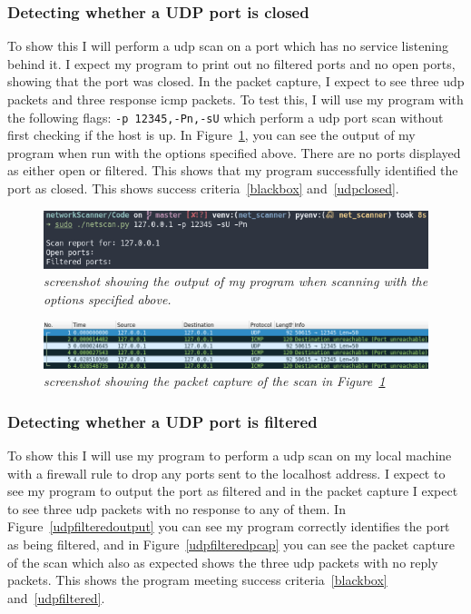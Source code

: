 \documentclass[titlepage]{article}
\let\Oldsubsubsection\subsubsection{}
\renewcommand{\subsubsection}{\FloatBarrier\Oldsubsubsection}
\begin{document}
\subsubsection{Detecting whether a UDP port is closed}\label{test:udpclosed}
To show this I will perform a \gls{udp} scan on a port which
has no service listening behind it. I expect my program to print out
no filtered ports and no open ports, showing that the port was closed.
In the packet capture, I expect to see three \gls{udp} packets and three response
\gls{icmp} packets. To test this, I will use my program with the following flags:
\verb|-p 12345,-Pn,-sU| which perform a \gls{udp} port scan without first checking
if the host is up. In Figure~\ref{udpclosedoutput}, you can see the output of my program
when run with the options specified above.
There are no ports displayed as either open or filtered.
This shows that my program successfully identified the port as closed.
This shows success criteria~\ref{blackbox} and~\ref{udpclosed}.

\begin{figure}[H]
  \centering
  \includegraphics[width=\textwidth]{udpclosedoutput.png}
  \caption{\textit{%
    screenshot showing the output of my program when scanning with the
    options specified above.
}}\label{udpclosedoutput}
\end{figure}

\begin{figure}[H]
  \centering
  \includegraphics[width=\textwidth]{udpclosedpcap.png}
  \caption{\textit{%
    screenshot showing the packet capture of the scan in Figure~\ref{udpclosedoutput}
}}\label{udpclosedcap}
\end{figure}

\subsubsection{Detecting whether a UDP port is filtered}\label{test:udpfiltered}
To show this I will use my program to perform a \gls{udp} scan on my local machine
with a firewall rule to drop any ports sent to the localhost address. I expect to see
my program to output the port as filtered and in the packet capture I expect to see
three \gls{udp} packets with no response to any of them.
In Figure~\ref{udpfilteredoutput} you can see my program correctly identifies
the port as being filtered, and in Figure~\ref{udpfilteredpcap} you can see
the packet capture of the scan which also as expected shows the three \gls{udp}
packets with no reply packets. This shows the program meeting success criteria~\ref{blackbox}
and~\ref{udpfiltered}.
\end{document}
